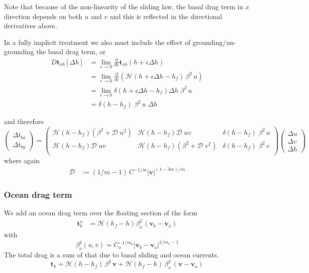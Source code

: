 \documentclass[10pt,a4paper]{book}
\newcommand{\He}{\mathcal{H}}
\begin{document}
Note that because of the non-linearity of the sliding law, the basal
drag term in $x$ direction depends on both $u$ and $v$ and this is
reflected in the directional derivatives above.

In a fully implicit treatment we also must include the effect of
grounding/un-grounding the basal drag term, or
\begin{align*}
D \bm{t}_{xb} [\Delta h] & =\lim_{\epsilon \to 0} \frac{d}{d\epsilon}  \bm{t}_{xb} (h+ \epsilon \Delta h) \\
                        &=\lim_{\epsilon \to 0} \frac{d}{d\epsilon}\left (  \He(h+\epsilon \Delta h- h_f)  \, \beta^2 \, u\right ) \\
                        &=\lim_{\epsilon \to 0} \delta(h+\epsilon \Delta h -h_f)  \Delta h  \; \beta^2 \, u\\
                        &=\delta(h-h_f)   \; \beta^2 \, u\; \Delta h
\end{align*}

and therefore
\begin{equation}
\begin{pmatrix} \Delta t_{bx}  \\ \Delta t_{by} \end{pmatrix}
=  \begin{pmatrix} \He(h-h_f) (\beta^2 + \mathcal{D} \; u^2 )&   \He(h-h_f) \mathcal{D}\; u v  &    \delta(h-h_f)   \; \beta^2  \, u\\
                 \He(h-h_f) \mathcal{D}\; u v    &  \He(h-h_f) ( \beta^2 +   \mathcal{D}\; v^2 ) &   \delta(h-h_f)   \; \beta^2  \, v\\
   \end{pmatrix}
\begin{pmatrix} \Delta u  \\ \Delta v \\ \Delta h \end{pmatrix}
\end{equation}
where again
\begin{align*}
\mathcal{D}& := (1/m-1) \, C^{-1/m}  |\bm{v}|^{(1-3m)/m} 
\end{align*}



\subsubsection{Ocean drag term}

We add an ocean drag term over the floating section of the form
\begin{align*} 
\bm{t}_b^o & = \He(h_f-h) \beta_o^2 \, (\bm{v}_b-\bm{v}_o) 
\end{align*}
with
\[
\beta_o^2(u,v)=C_o^{-1/m_o} | \bm{v}_b - \bm{v}_o|^{1/m_o-1} 
\]
The total drag is a sum of that due to basal sliding and ocean currents. 
\[
\bm{t}_b=\He(h-h_f) \, \beta^2 \, \bm{v} + \He(h_f-h) \, \beta^2_o \, (\bm{v}-\bm{v}_o)
\] 
\end{document}
